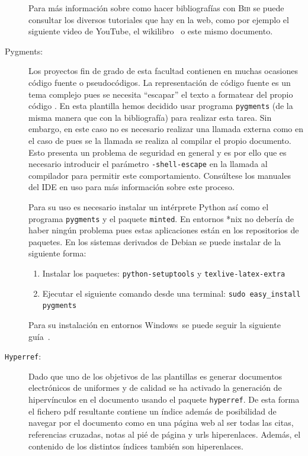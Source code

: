 \documentclass{DeustoFDP}
\begin{document}
\begin{description}
    Para m\'as informaci\'on sobre como hacer bibliograf\'ias con
    \textsc{Bib} se puede consultar los diversos tutoriales que hay en la
    web, como por ejemplo el siguiente video \cite{youtube} de YouTube\textregistered,
    el wikilibro~\cite{wikilibro} o este mismo documento.

  \item[Pygments:] Los proyectos fin de grado de esta facultad contienen
    en muchas ocasiones c\'odigo fuente o pseudoc\'odigos. La representaci\'on
    de c\'odigo fuente es un tema complejo pues se necesita \enquote{escapar}
    el texto a formatear del propio c\'odigo . En esta plantilla
    hemos decidido usar programa \texttt{pygments} (de la misma manera que con
    la bibliograf\'ia) para realizar esta tarea.  Sin embargo, en este caso no
    es necesario realizar una llamada externa como en el caso de 
    pues se la llamada se realiza al compilar el propio documento. Esto presenta
    un problema de seguridad en general y es por ello que es necesario introducir
    el par\'ametro \verb+-shell-escape+ en la llamada al compilador para permitir
    este comportamiento. Cons\'ultese los manuales del IDE en uso para m\'as
    informaci\'on sobre este proceso.

    Para su uso es necesario instalar un int\'erprete Python as\'i como el
    programa \texttt{pygments} y el paquete \texttt{minted}. En entornos *nix
    no deber\'ia de haber ning\'un problema pues estas aplicaciones est\'an
    en los repositorios de paquetes. En los sistemas derivados de Debian se puede
    instalar de la siguiente forma:
    \begin{enumerate}
      \item Instalar los paquetes: \texttt{python-setuptools} y \texttt{texlive-latex-extra}
      \item Ejecutar el siguiente comando desde una terminal: \texttt{sudo easy\_install pygments}
    \end{enumerate}

    Para su instalaci\'on en entornos Windows\texttrademark\ se puede seguir la
    siguiente gu\'ia~\cite{pygments}.

  \item[\texttt{Hyperref}:] Dado que uno de los objetivos de las plantillas es generar
    documentos electr\'onicos de uniformes y de calidad se ha activado la
    generaci\'on de hiperv\'inculos en el documento usando el paquete \texttt{hyperref}.
    De esta forma el fichero pdf resultante contiene un \'indice adem\'as de
    posibilidad de navegar por el documento como en una p\'agina web al
    ser todas las citas, referencias cruzadas, notas al pi\'e de p\'agina y urls
    hiperenlaces. Adem\'as, el contenido de los distintos \'indices tambi\'en
    son hiperenlaces.
\end{description}
\end{document}
